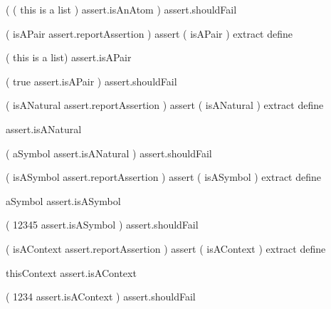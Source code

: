 \startJoylolTest
(
  ( this is a list )
  assert.isAnAtom
) assert.shouldFail
\stopJoylolTest
\stopTestCase
\stopTestSuite


\startJoylolCode
(
  isAPair
  assert.reportAssertion
)
assert
( isAPair ) extract
define
\stopJoylolCode

\startJoylolTest
( this is a list)
assert.isAPair
\stopJoylolTest
\stopTestCase

\startJoylolTest
(
  true
  assert.isAPair
) assert.shouldFail
\stopJoylolTest
\stopTestCase
\stopTestSuite


\startJoylolCode
(
  isANatural
  assert.reportAssertion
)
assert
( isANatural ) extract
define
\stopJoylolCode

assert.isANatural
\stopJoylolTest
\stopTestCase

\startJoylolTest
(
  aSymbol
  assert.isANatural
) assert.shouldFail
\stopJoylolTest
\stopTestCase
\stopTestSuite


\startJoylolCode
(
  isASymbol
  assert.reportAssertion
)
assert
( isASymbol ) extract
define
\stopJoylolCode

\startJoylolTest
aSymbol
assert.isASymbol
\stopJoylolTest
\stopTestCase

\startJoylolTest
(
  12345
  assert.isASymbol
) assert.shouldFail
\stopJoylolTest
\stopTestCase
\stopTestSuite


\startJoylolCode
(
  isAContext
  assert.reportAssertion
)
assert
( isAContext ) extract
define
\stopJoylolCode

\startJoylolTest
thisContext
assert.isAContext
\stopJoylolTest
\stopTestCase

\startJoylolTest
(
  1234
  assert.isAContext
) assert.shouldFail
\stopJoylolTest
\stopTestCase
\stopTestSuite

